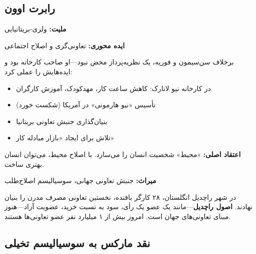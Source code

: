 \subsection{رابرت اوون}

\begin{personbox}

\textbf{ملیت:} ولزی-بریتانیایی

\textbf{ایده محوری:} تعاونی‌گری و اصلاح اجتماعی

\mediumspace

 برخلاف سن‌سیمون و فوریه، یک نظریه‌پرداز محض نبود—او صاحب کارخانه بود و ایده‌هایش را عملی کرد:

\begin{itemize}[nosep]
    \item در کارخانه نیو لانارک: کاهش ساعت کار، مهدکودک، آموزش کارگران
    \item تأسیس «نیو هارمونی» در آمریکا (شکست خورد)
    \item بنیان‌گذاری جنبش تعاونی بریتانیا
    \item تلاش برای ایجاد «بازار مبادله کار»
\end{itemize}

\mediumspace

\textbf{اعتقاد اصلی:} «محیط» شخصیت انسان را می‌سازد. با اصلاح محیط، می‌توان انسان بهتری ساخت.

\mediumspace

\textbf{میراث:} جنبش تعاونی جهانی، سوسیالیسم اصلاح‌طلب
\end{personbox}

\begin{historybox}
در شهر راچدیل انگلستان، ۲۸ کارگر بافنده، نخستین تعاونی مصرف مدرن را بنیان نهادند. \textbf{اصول راچدیل}—مانند یک عضو یک رأی، سود به نسبت خرید، عضویت آزاد—هنوز مبنای تعاونی‌های جهان است. امروز بیش از ۱ میلیارد نفر عضو تعاونی‌ها هستند.
\end{historybox}

\subsection{نقد مارکس به سوسیالیسم تخیلی}

